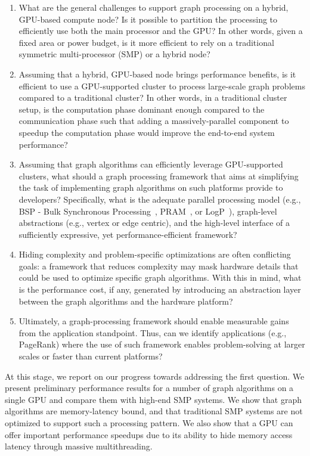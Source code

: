 \begin{enumerate}
\item What are the general challenges to support graph processing on a hybrid, GPU-based compute node? Is it possible to partition the processing to efficiently use both the main processor and the GPU? In other words, given a fixed area or power budget, is it more efficient to rely on a traditional symmetric multi-processor (SMP) or a hybrid node?

\item Assuming that a hybrid, GPU-based node brings performance benefits, is it efficient to use a GPU-supported cluster to process large-scale graph problems compared to a traditional cluster? In other words, in a traditional cluster setup, is the computation phase dominant enough compared to the communication phase such that adding a massively-parallel component to speedup the computation phase would improve the end-to-end system performance?

\item Assuming that graph algorithms can efficiently leverage GPU-supported clusters, what should a graph processing framework that aims at simplifying the task of implementing graph algorithms on such platforms provide to developers? Specifically, what is the adequate parallel processing model (e.g., BSP - Bulk Synchronous Processing~\cite{Valiant1990}, PRAM~\cite{Fortune78}, or LogP~\cite{Culler1996}), graph-level abstractions (e.g., vertex or edge centric), and the high-level interface of a sufficiently expressive, yet performance-efficient framework?

\item Hiding complexity and problem-specific optimizations are often conflicting goals: a framework that reduces complexity may mask hardware details that could be used to optimize specific graph algorithms. With this in mind, what is the performance cost, if any, generated by introducing an abstraction layer between the graph algorithms and the hardware platform?

\item Ultimately, a graph-processing framework should enable measurable gains from the application standpoint. Thus, can we identify applications (e.g., PageRank) where the use of such framework enables problem-solving at larger scales or faster than current platforms?

\end{enumerate}

At this stage, we report on our progress towards addressing the first question. We present preliminary performance results for a number of graph algorithms on a single GPU and compare them with high-end SMP systems. We show that graph algorithms are memory-latency bound, and that traditional SMP systems are not optimized to support such a processing pattern. We also show that a GPU can offer important performance speedups due to its ability to hide memory access latency through massive multithreading.

